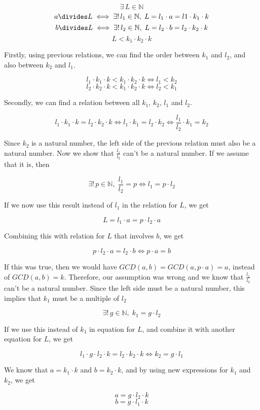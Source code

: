 \documentclass{article}
\begin{document}
\[ \exists \, L \in \mathbb{N} \]
\[ a \divides L \iff \exists! \, l_1 \in \mathbb{N} , \; L = l_1 \cdot a = l1 \cdot k_1 \cdot k \]
\[ b \divides L \iff \exists! \, l_2 \in \mathbb{N}, \; L = l_2 \cdot b = l_2 \cdot k_2 \cdot k \]
\[ L < k_1 \cdot k_2 \cdot k \]

Firstly, using previous relations, we can find the order between $k_1$ and $l_2$, and also between $k_2$ and $l_1$.

\[ l_1 \cdot k_1 \cdot k < k_1 \cdot k_2 \cdot k \iff l_1 < k_2 \]
\[ l_2 \cdot k_2 \cdot k < k_1 \cdot k_2 \cdot k \iff l_2 < k_1 \]

Secondly, we can find a relation between all $k_1$, $k_2$, $l_1$ and $l_2$.

\[ l_1 \cdot k_1 \cdot k = l_2 \cdot k_2 \cdot k \iff l_1 \cdot k_1 = l_2 \cdot k_2 \iff \frac{l_1}{l_2} \cdot k_1 = k_2 \]

Since $k_2$ is a natural number, the left side of the previous relation must also be a natural number. Now we show that $\frac{l_1}{l_2}$ can't be a natural number. If we assume that it is, then

\[ \exists! \, p \in \mathbb{N} , \; \frac{l_1}{l_2} = p \iff l_1 = p \cdot l_2 \]

If we now use this result instead of $l_1$ in the relation for $L$, we get

\[ L = l_1 \cdot a = p \cdot l_2 \cdot a \]

Combining this with relation for $L$ that involves $b$, we get

\[ p \cdot l_2 \cdot a = l_2 \cdot b \iff p \cdot a = b \]

If this was true, then we would have $GCD(a, b) = GCD(a, p \cdot a) = a$, instead of $GCD(a, b) = k$. Therefore, our assumption was wrong and we know that $\frac{l_1}{l_2}$ can't be a natural number. Since the left side must be a natural number, this implies that $k_1$ must be a multiple of $l_2$

\[ \exists! \, g \in \mathbb{N}, \; k_1 = g \cdot l_2 \]

If we use this instead of $k_1$ in equation for $L$, and combine it with another equation for $L$, we get

\[ l_1 \cdot g \cdot l_2 \cdot k = l_2 \cdot k_2 \cdot k \iff k_2 = g \cdot l_1 \]

We know that $a = k_1 \cdot k$ and $b = k_2 \cdot k$, and by using new expressions for $k_1$ and $k_2$, we get

\[ a = g \cdot l_2 \cdot k \]
\[ b = g \cdot l_1 \cdot k \]
\end{document}
